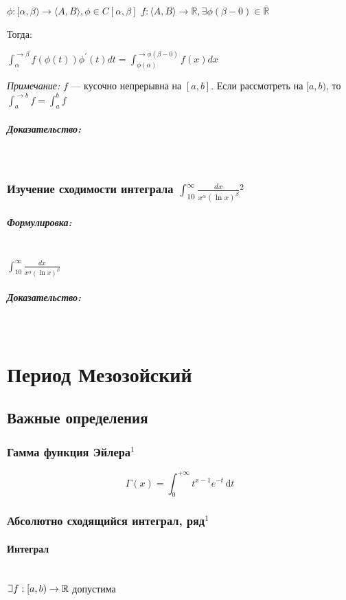 \documentclass{article}
\def\letus{%
\mathord{\setbox0=\hbox{$\exists$}%
         \hbox{\kern 0.125\wd0%
               \vbox to \ht0{%
                  \hrule width 0.75\wd0%
                  \vfill%
                  \hrule width 0.75\wd0}%
               \vrule height \ht0%
               \kern 0.125\wd0}%
       }%
        }
\def\D{\,\mathrm{d}}
\let\vanillaparagraph\paragraph
\let\vanillasubparagraph\subparagraph
\renewcommand{\paragraph}[1]{\vanillaparagraph{#1}\mbox{}\\}
\renewcommand{\subparagraph}[1]{\vanillasubparagraph{#1}\mbox{}\\}
\begin{document}
\begin{enumerate}
    $\phi: [\alpha, \beta) \rightarrow \langle A, B \rangle, \phi \in C[\alpha, \beta]$ 
    $f: \langle A, B \rangle \rightarrow \mathbb{R}, \exists \phi(\beta - 0) \in \overline{\mathbb{R}}$
    
    Тогда:
    
    $\int_\alpha^{\rightarrow \beta}{f(\phi(t))\phi^\prime(t)dt} =
     \int_{\phi(\alpha)}^{\rightarrow \phi(\beta - 0)}{f(x)dx}$
     
     \textit{Примечание:}
     $f$ --- кусочно непрерывна на $[a, b]$. Если рассмотреть на $[a, b)$, то $\int_a^{\rightarrow b}{f} = \int_a^b{f}$
    

\end{enumerate}

\subparagraph{Доказательство:}




\subsubsection{Изучение сходимости интеграла \texorpdfstring{$\int_{10}^\infty \frac{dx}{x^\alpha (\ln x)^\beta}$}{int [10, inf] dx/x\^a(ln x)\^b}\texorpdfstring{$^2$}{}}

\subparagraph{Формулировка:}

$\int_{10}^\infty \frac{dx}{x^\alpha (\ln x)^\beta}$

\subparagraph{Доказательство:}



\section{Период Мезозойский}
\subsection{Важные определения}
\subsubsection{Гамма функция Эйлера\texorpdfstring{$^1$}{}}
$$
\Gamma(x) = \int^{+\infty}_0 t^{x-1} e^{-t} \D t
$$

\subsubsection{Абсолютно сходящийся интеграл, ряд\texorpdfstring{$^1$}{}}
\paragraph{Интеграл}
$\letus f: [ a, b ) \rightarrow \mathbb{R} $ допустима
\end{document}
